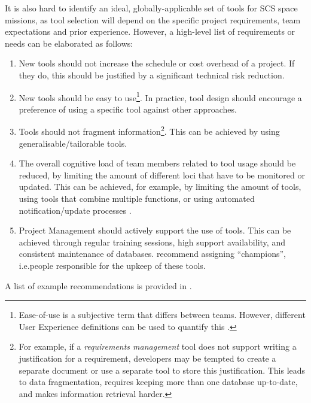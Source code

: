 \documentclass[a4paper,nobib,justified,final]{tufte-book}
\begin{document}
It is also hard to identify an ideal, globally-applicable set of tools for \acs{SCS} space missions, as tool selection will depend on the specific project requirements, team expectations and prior experience. However, a high-level list of requirements or needs can be elaborated as follows:
\begin{enumerate}[itemsep=-2ex]
	\item New tools should not increase the schedule or cost overhead of a project. If they do, this should be justified by a significant technical risk reduction.
	\item New tools should be easy to use\footnote{Ease-of-use is a subjective term that differs between teams. However, different User Experience definitions can be used to quantify this \cite{internetarchiveHumancomputerInteractionNew2002}.}. In practice, tool design should encourage a preference of using a specific tool against other approaches.
	\item Tools should not fragment information\footnote{For example, if a \emph{requirements management} tool does not support writing a justification for a requirement, developers may be tempted to create a separate document or use a separate tool to store this justification. This leads to data fragmentation, requires keeping more than one database up-to-date, and makes information retrieval harder.}. This can be achieved by using generalisable/tailorable tools.
	\item The overall cognitive load of team members related to tool usage should be reduced, by limiting the amount of different loci that have to be monitored or updated. This can be achieved, for example, by limiting the amount of tools, using tools that combine multiple functions, or using automated notification/update processes \autocite{goodwinWhatSaaSSprawl2025}.
	\item Project Management should actively support the use of tools. This can be achieved through regular training sessions, high support availability, and consistent maintenance of databases.
	\citeauthor{honore-livermoreManagingProductDevelopment2021} \cite{honore-livermoreManagingProductDevelopment2021} recommend assigning ``champions'', i.e.\@ people responsible for the upkeep of these tools.
\end{enumerate}

A list of example recommendations is provided in .
\end{document}
